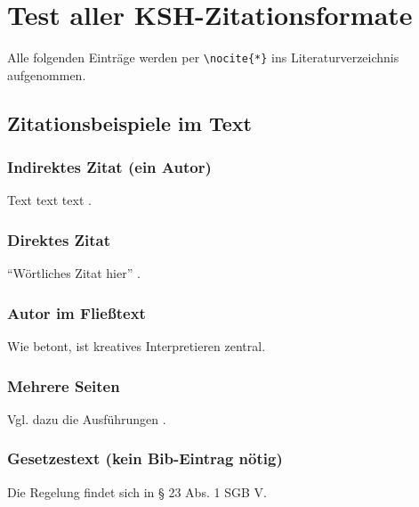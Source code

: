 





\chapter{Test aller KSH-Zitationsformate}

Alle folgenden Einträge werden per \verb|\nocite{*}| ins Literaturverzeichnis aufgenommen.

\nocite{*}

\section{Zitationsbeispiele im Text}

\subsection{Indirektes Zitat (ein Autor)}
Text text text \parencite[vgl.][26]{kessl2010}.

\subsection{Direktes Zitat}
\enquote{Wörtliches Zitat hier} \parencite[26]{kessl2010}.

\subsection{Autor im Fließtext}
Wie \textcite[42]{lenk1996} betont, ist kreatives Interpretieren zentral.

\subsection{Mehrere Seiten}
Vgl. dazu die Ausführungen \parencite[vgl.][26\psqq]{kessl2010}.

\subsection{Gesetzestext (kein Bib-Eintrag nötig)}
Die Regelung findet sich in § 23 Abs. 1 SGB V.

\newpage
\printbibliography[title={Literaturverzeichnis}]



